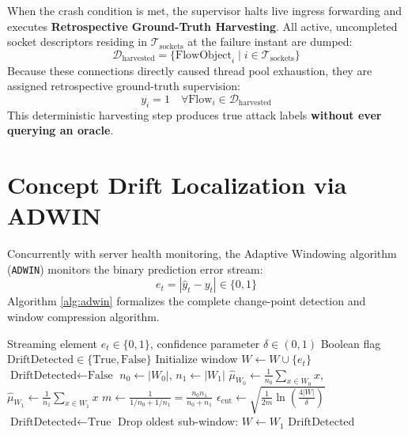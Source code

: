 \documentclass[12pt,a4paper,oneside]{report}
\begin{document}
When the crash condition is met, the supervisor halts live ingress forwarding and executes \textbf{Retrospective Ground-Truth Harvesting}. All active, uncompleted socket descriptors residing in $\mathcal{T}_{\text{sockets}}$ at the failure instant are dumped:
\begin{equation}
\mathcal{D}_{\text{harvested}} = \{ \text{FlowObject}_i \mid i \in \mathcal{T}_{\text{sockets}} \}
\end{equation}
Because these connections directly caused thread pool exhaustion, they are assigned retrospective ground-truth supervision:
\begin{equation}
y_i = 1 \quad \forall \text{Flow}_i \in \mathcal{D}_{\text{harvested}}
\end{equation}
This deterministic harvesting step produces true attack labels \textbf{without ever querying an oracle}.

\section{Concept Drift Localization via ADWIN}
Concurrently with server health monitoring, the Adaptive Windowing algorithm (\texttt{ADWIN}) monitors the binary prediction error stream:
\begin{equation}
e_t = |\hat{y}_t - y_t| \in \{0, 1\}
\end{equation}
Algorithm \ref{alg:adwin} formalizes the complete change-point detection and window compression algorithm.

\begin{algorithm}[htbp]
\caption{Adaptive Windowing (ADWIN) Drift Detection Algorithm}
\label{alg:adwin}
\begin{algorithmic}[1]
\REQUIRE Streaming element $e_t \in \{0, 1\}$, confidence parameter $\delta \in (0, 1)$
\ENSURE Boolean flag $\text{DriftDetected} \in \{\text{True}, \text{False}\}$
\STATE Initialize window $W \gets W \cup \{e_t\}$
\STATE $\text{DriftDetected} \gets \text{False}$
\REPEAT
        \STATE $n_0 \gets |W_0|$, \quad $n_1 \gets |W_1|$
        \STATE $\hat{\mu}_{W_0} \gets \frac{1}{n_0} \sum_{x \in W_0} x$, \quad $\hat{\mu}_{W_1} \gets \frac{1}{n_1} \sum_{x \in W_1} x$
        \STATE $m \gets \frac{1}{1/n_0 + 1/n_1} = \frac{n_0 n_1}{n_0 + n_1}$
        \STATE $\epsilon_{\text{cut}} \gets \sqrt{\frac{1}{2m} \ln\left( \frac{4 |W|}{\delta} \right)}$
            \STATE $\text{DriftDetected} \gets \text{True}$
            \STATE Drop oldest sub-window: $W \gets W_1$
            \BREAK
        \ENDIF
    \ENDFOR
{}
\RETURN $\text{DriftDetected}$
\end{algorithmic}
\end{algorithm}
\end{document}
